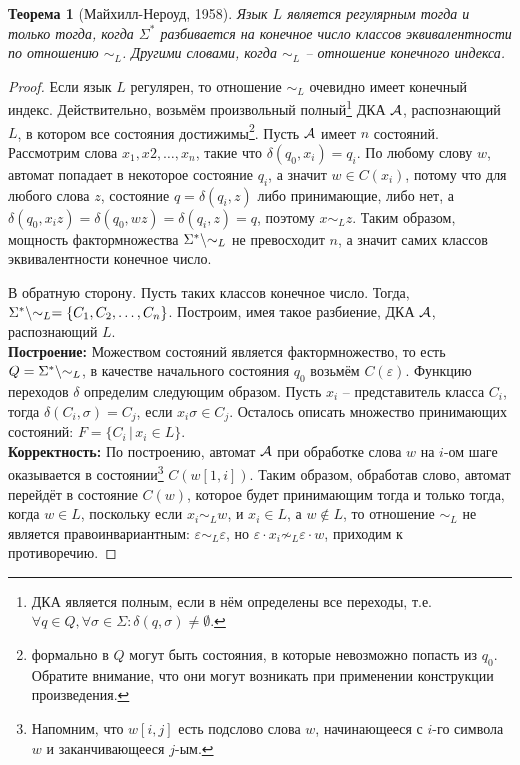 \documentclass[12pt]{article}
\theoremstyle{definiton}
\newtheorem{Theorem}{Теорема}
\theoremstyle{definition}
\theoremstyle{definition}
\let\es\emptyset
\let\eps\varepsilon
\def\A{{\cal A}}
\def\quotient{\backslash\negthickspace\sim}
\begin{document}
	\begin{Theorem}[Майхилл-Нероуд, 1958]
		Язык $L$ является регулярным тогда и только тогда, когда $\Sigma^*$ разбивается на конечное число классов эквивалентности по отношению $\sim_L$. Другими словами, когда $\sim_L$ -- отношение конечного индекса. 
	\end{Theorem}
	\begin{proof}
		Если язык $L$ регулярен, то отношение $\sim_L$  очевидно имеет конечный индекс. Действительно, возьмём произвольный полный\footnote{ДКА является полным, если в нём определены все переходы, т.е. $\forall q \in Q, \forall \sigma \in \Sigma : \delta(q,\sigma) \neq \es$.} ДКА $\A$, распознающий $L$, в котором все состояния достижимы\footnote{формально в $Q$ могут быть состояния, в которые невозможно попасть из $q_0$. Обратите внимание, что они могут возникать при применении конструкции произведения.}. Пусть $\A$ имеет $n$ состояний. Рассмотрим  слова $x_1,x2, \ldots,x_n$, такие что $\delta(q_0,x_i) = q_i$. По любому слову $w$, автомат попадает в некоторое состояние $q_i$, а значит $w \in C(x_i)$, потому что для любого слова $z$,  состояние $q = \delta(q_i, z) $ либо принимающие, либо нет, а $\delta(q_0,x_iz) = \delta(q_0,wz) = \delta(q_i,z) = q$, поэтому $x \sim_L z$. Таким образом, мощность фактормножества $\Sigma^*\quotient_L$ не превосходит $n$, а значит самих классов эквивалентности конечное число.

		В обратную сторону. Пусть таких классов конечное число. Тогда, $\Sigma^*\quotient_L = \{C_1, C_2, \ldots, C_n\}$. Построим, имея такое разбиение, ДКА $\A$, распознающий $L$. \\
		\textbf{Построение:} Можеством состояний является фактормножество, то есть $Q = \Sigma^*\quotient_L$, в качестве начального состояния $q_0$ возьмём $C(\eps)$. Функцию переходов $\delta$ определим следующим образом. Пусть $x_i$ -- представитель класса $C_i$, тогда $\delta(C_i, \sigma) = C_j$, если $x_i\sigma \in C_j$. Осталось описать множество принимающих состояний: $F = \{ C_i\, |\, x_i \in L \}$.\\
		\textbf{Корректность:} По построению, автомат $\A$ при обработке слова $w$ на $i$-ом шаге оказывается в состоянии\footnote{Напомним, что $w[i,j]$ есть подслово слова $w$, начинающееся с $i$-го символа $w$ и заканчивающееся $j$-ым.} $C(w[1,i])$. Таким образом, обработав слово, автомат перейдёт в состояние $C(w)$, которое будет принимающим тогда и только тогда, когда $w \in L$, поскольку если $x_i \sim_L w$, и $x_i \in L$, а $w \not\in L$, то отношение $\sim_L$ не является правоинвариантным: $\eps \sim_L \eps$, но $\eps\cdot x_i \not\sim_L \eps\cdot w$, приходим к противоречию.
	\end{proof}
\end{document}
